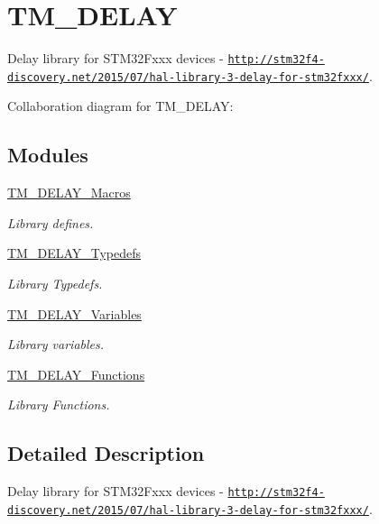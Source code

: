\hypertarget{group___t_m___d_e_l_a_y}{}\section{T\+M\+\_\+\+D\+E\+L\+AY}
\label{group___t_m___d_e_l_a_y}


Delay library for S\+T\+M32\+Fxxx devices -\/ \href{http://stm32f4-discovery.net/2015/07/hal-library-3-delay-for-stm32fxxx/}{\tt http\+://stm32f4-\/discovery.\+net/2015/07/hal-\/library-\/3-\/delay-\/for-\/stm32fxxx/}.  


Collaboration diagram for T\+M\+\_\+\+D\+E\+L\+AY\+:
\subsection*{Modules}
\begin{DoxyCompactItemize}
\item 
\hyperlink{group___t_m___d_e_l_a_y___macros}{T\+M\+\_\+\+D\+E\+L\+A\+Y\+\_\+\+Macros}
\begin{DoxyCompactList}\small\item\em Library defines. \end{DoxyCompactList}\item 
\hyperlink{group___t_m___d_e_l_a_y___typedefs}{T\+M\+\_\+\+D\+E\+L\+A\+Y\+\_\+\+Typedefs}
\begin{DoxyCompactList}\small\item\em Library Typedefs. \end{DoxyCompactList}\item 
\hyperlink{group___t_m___d_e_l_a_y___variables}{T\+M\+\_\+\+D\+E\+L\+A\+Y\+\_\+\+Variables}
\begin{DoxyCompactList}\small\item\em Library variables. \end{DoxyCompactList}\item 
\hyperlink{group___t_m___d_e_l_a_y___functions}{T\+M\+\_\+\+D\+E\+L\+A\+Y\+\_\+\+Functions}
\begin{DoxyCompactList}\small\item\em Library Functions. \end{DoxyCompactList}\end{DoxyCompactItemize}


\subsection{Detailed Description}
Delay library for S\+T\+M32\+Fxxx devices -\/ \href{http://stm32f4-discovery.net/2015/07/hal-library-3-delay-for-stm32fxxx/}{\tt http\+://stm32f4-\/discovery.\+net/2015/07/hal-\/library-\/3-\/delay-\/for-\/stm32fxxx/}. 

